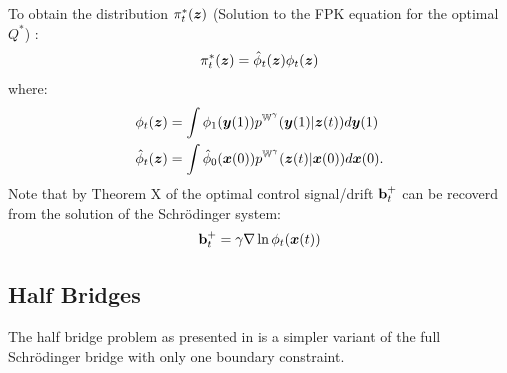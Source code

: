 \documentclass[a4paper,12pt,twoside,openright]{report}
\theoremstyle{definition}
\begin{document}
To obtain the distribution $\pi^{*}_t({\bm{z}})$ (Solution to the FPK equation for the optimal $Q^{*}$) :
\begin{align}
    \pi^{*}_t({\bm{z}}) =  {\hat{\phi}}_t({\bm{z}}) \phi_t({\bm{z}}) 
\end{align}
where:
\begin{align}
    \phi_t({\bm{z}}) &= \int \phi_1({\bm{y}}(1) ) p^{\mathbb{W}^{\gamma}}({\bm{y}}(1)|{\bm{z}}(t)) d{\bm{y}}(1) \nonumber\\ 
    {\hat{\phi}}_t({\bm{z}}) &= \int {\hat{\phi}}_0({\bm{x}}(0)) p^{\mathbb{W}^{\gamma}}({\bm{z}}(t)|{\bm{x}}(0)) d{\bm{x}}(0). \nonumber
\end{align}
Note that by Theorem X of \cite{pavon1991free} the optimal control signal/drift ${\mathbf{b}}_t^+$ can be recoverd from the solution of the Schrödinger system:
\begin{align} \label{eq:drifr_potential}
    {\mathbf{b}}_t^{+} = \gamma \nabla \ln \phi_t({\bm{x}}(t) )
\end{align}
\subsection{Half Bridges}

The half bridge problem as presented in \cite{pavon2018data} is a simpler variant of the full Schrödinger bridge with only one boundary constraint. 
\end{document}
